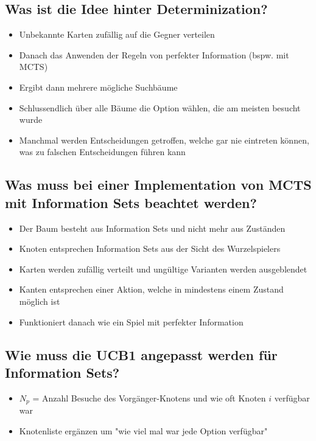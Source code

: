 \documentclass[a4paper]{article}
\begin{document}
		\subsection{Was ist die Idee hinter Determinization?}
		
		\begin{itemize}
			\item Unbekannte Karten zufällig auf die Gegner verteilen
			\item Danach das Anwenden der Regeln von perfekter Information (bspw. mit MCTS)
			\item Ergibt dann mehrere mögliche Suchbäume
			\item Schlussendlich über alle Bäume die Option wählen, die am meisten besucht wurde
			\item Manchmal werden Entscheidungen getroffen, welche gar nie eintreten können, was zu falschen Entscheidungen führen kann
		\end{itemize}
	
		\subsection{Was muss bei einer Implementation von MCTS mit Information Sets beachtet werden?}
		
		\begin{itemize}
			\item Der Baum besteht aus Information Sets und nicht mehr aus Zuständen
			\item Knoten entsprechen Information Sets aus der Sicht des Wurzelspielers
			\item Karten werden zufällig verteilt und ungültige Varianten werden ausgeblendet
			\item Kanten entsprechen einer Aktion, welche in mindestens einem Zustand möglich ist
			\item Funktioniert danach wie ein Spiel mit perfekter Information
		\end{itemize}
	
		\subsection{Wie muss die UCB1 angepasst werden für Information Sets?}
		
		\begin{itemize}
			\item $N_{p}$ = Anzahl Besuche des Vorgänger-Knotens und wie oft Knoten $i$ verfügbar war
			\item Knotenliste ergänzen um "wie viel mal war jede Option verfügbar"
		\end{itemize}
	
\end{document}
